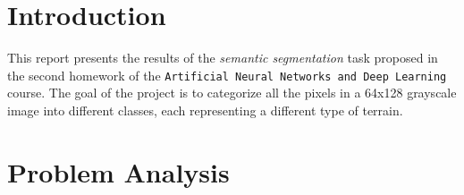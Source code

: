 \documentclass[11pt]{article}
\begin{document}
\begin{multicols}{2}

      \section{Introduction}


      This report presents the results of the \textit{semantic segmentation}
      task proposed in the second homework of the \texttt{Artificial Neural Networks and Deep Learning} course. The goal of the project is to categorize all the pixels in a 64x128 grayscale image into different classes, each representing a different type of terrain.

      \section{Problem Analysis}


\end{multicols}
\end{document}
